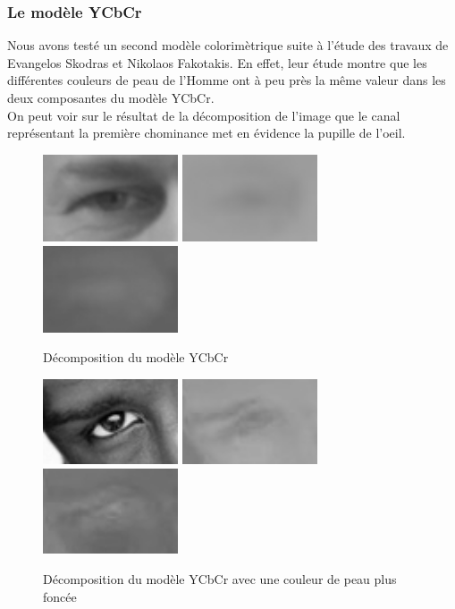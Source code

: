 \subsubsection{Le modèle YCbCr}

Nous avons testé un second modèle colorimètrique suite à l'étude des travaux de Evangelos Skodras et Nikolaos Fakotakis\cite{Skodras_2012ieee}.
En effet, leur étude montre que les différentes couleurs de peau de l'Homme ont à peu près la même valeur dans les deux
composantes du modèle YCbCr.\\

On peut voir sur le résultat de la décomposition de l'image que le canal représentant la première chominance met 
en évidence la pupille de l'oeil.
\begin{figure}[H]
 \center
 \includegraphics[width=4cm]{image/luminance.png}
 \includegraphics[width=4cm]{image/chrominance1.png}
 \includegraphics[width=4cm]{image/chrominance2.png}
 \caption{Décomposition du modèle YCbCr}
\end{figure}

\begin{figure}[H]
 \center
 \includegraphics[width=4cm]{image/luminance_black.png}
 \includegraphics[width=4cm]{image/chrominance1_black.png}
 \includegraphics[width=4cm]{image/chrominance2_black.png}
 \caption{Décomposition du modèle YCbCr avec une couleur de peau plus foncée}
\end{figure}

